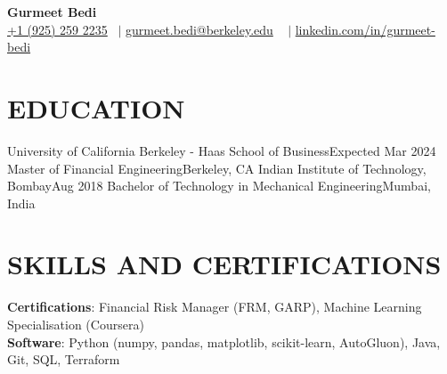 

\begin{center}
    {\Huge  \textbf{Gurmeet Bedi}} \\ \vspace{1pt}
    \small  \href{tel:19252592235}{+1 (925) 259 2235}  ~$\mid$ \href{mailto:gurmeet.bedi@berkeley.edu}{ gurmeet.bedi@berkeley.edu} ~ $\mid$ \href{https://www.linkedin.com/in/gurmeet-bedi/}{ linkedin.com/in/gurmeet-bedi} 
    \\
    \vspace{1pt}
    \vspace{-8pt}
\end{center}


\section{EDUCATION}
  \resumeSubHeadingListStart
  \resumeSubheading
      {University of California Berkeley - Haas School of Business}{Expected Mar 2024}
      {Master of Financial Engineering}{Berkeley, CA}{}
    \resumeSubheading
      {Indian Institute of Technology, Bombay}{Aug 2018}
      {Bachelor of Technology in Mechanical Engineering}{Mumbai, India}{}
  \resumeSubHeadingListEnd


\section{SKILLS AND CERTIFICATIONS}
 \begin{itemize}[leftmargin=0.00in, label={}]
    \small{\item{
    \textbf{Certifications}{: Financial Risk Manager (FRM, GARP), Machine Learning Specialisation (Coursera)} \\
     \textbf{Software}{: 
     Python (numpy, pandas, matplotlib, scikit-learn, AutoGluon), 
     Java, 
     Git, 
     SQL, 
     Terraform
     }}}
 \end{itemize}
 \vspace{-16pt}

